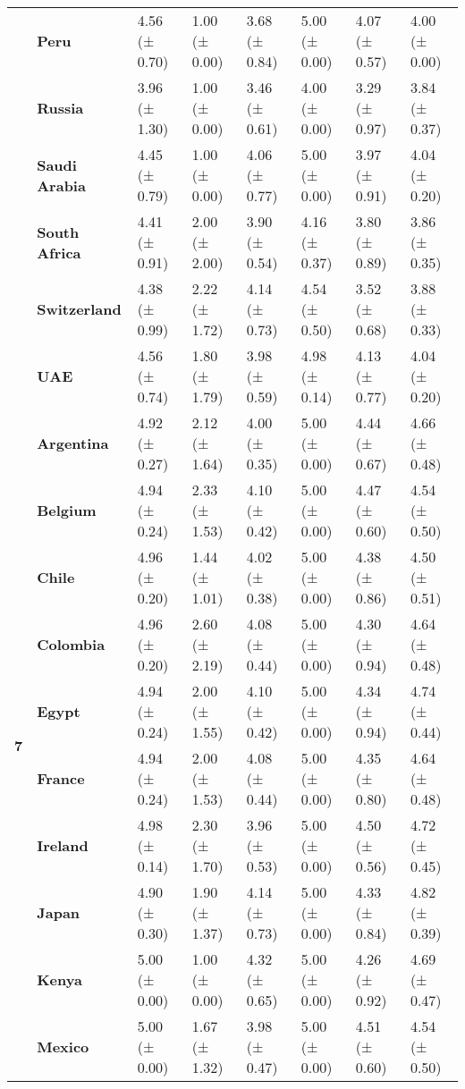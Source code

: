 \begin{longtable}{llllllll}
\textbf{} & \textbf{Peru} & 4.56 (± 0.70) & 1.00 (± 0.00) & 3.68 (± 0.84) & 5.00 (± 0.00) & 4.07 (± 0.57) & 4.00 (± 0.00) \\
\textbf{} & \textbf{Russia} & 3.96 (± 1.30) & 1.00 (± 0.00) & 3.46 (± 0.61) & 4.00 (± 0.00) & 3.29 (± 0.97) & 3.84 (± 0.37) \\
\textbf{} & \textbf{Saudi Arabia} & 4.45 (± 0.79) & 1.00 (± 0.00) & 4.06 (± 0.77) & 5.00 (± 0.00) & 3.97 (± 0.91) & 4.04 (± 0.20) \\
\textbf{} & \textbf{South Africa} & 4.41 (± 0.91) & 2.00 (± 2.00) & 3.90 (± 0.54) & 4.16 (± 0.37) & 3.80 (± 0.89) & 3.86 (± 0.35) \\
\textbf{} & \textbf{Switzerland} & 4.38 (± 0.99) & 2.22 (± 1.72) & 4.14 (± 0.73) & 4.54 (± 0.50) & 3.52 (± 0.68) & 3.88 (± 0.33) \\
\textbf{} & \textbf{UAE} & 4.56 (± 0.74) & 1.80 (± 1.79) & 3.98 (± 0.59) & 4.98 (± 0.14) & 4.13 (± 0.77) & 4.04 (± 0.20) \\
\cline{1-8}
\multirow[t]{19}{*}{\textbf{7}} & \textbf{Argentina} & 4.92 (± 0.27) & 2.12 (± 1.64) & 4.00 (± 0.35) & 5.00 (± 0.00) & 4.44 (± 0.67) & 4.66 (± 0.48) \\
\textbf{} & \textbf{Belgium} & 4.94 (± 0.24) & 2.33 (± 1.53) & 4.10 (± 0.42) & 5.00 (± 0.00) & 4.47 (± 0.60) & 4.54 (± 0.50) \\
\textbf{} & \textbf{Chile} & 4.96 (± 0.20) & 1.44 (± 1.01) & 4.02 (± 0.38) & 5.00 (± 0.00) & 4.38 (± 0.86) & 4.50 (± 0.51) \\
\textbf{} & \textbf{Colombia} & 4.96 (± 0.20) & 2.60 (± 2.19) & 4.08 (± 0.44) & 5.00 (± 0.00) & 4.30 (± 0.94) & 4.64 (± 0.48) \\
\textbf{} & \textbf{Egypt} & 4.94 (± 0.24) & 2.00 (± 1.55) & 4.10 (± 0.42) & 5.00 (± 0.00) & 4.34 (± 0.94) & 4.74 (± 0.44) \\
\textbf{} & \textbf{France} & 4.94 (± 0.24) & 2.00 (± 1.53) & 4.08 (± 0.44) & 5.00 (± 0.00) & 4.35 (± 0.80) & 4.64 (± 0.48) \\
\textbf{} & \textbf{Ireland} & 4.98 (± 0.14) & 2.30 (± 1.70) & 3.96 (± 0.53) & 5.00 (± 0.00) & 4.50 (± 0.56) & 4.72 (± 0.45) \\
\textbf{} & \textbf{Japan} & 4.90 (± 0.30) & 1.90 (± 1.37) & 4.14 (± 0.73) & 5.00 (± 0.00) & 4.33 (± 0.84) & 4.82 (± 0.39) \\
\textbf{} & \textbf{Kenya} & 5.00 (± 0.00) & 1.00 (± 0.00) & 4.32 (± 0.65) & 5.00 (± 0.00) & 4.26 (± 0.92) & 4.69 (± 0.47) \\
\textbf{} & \textbf{Mexico} & 5.00 (± 0.00) & 1.67 (± 1.32) & 3.98 (± 0.47) & 5.00 (± 0.00) & 4.51 (± 0.60) & 4.54 (± 0.50) \\

\end{longtable}
